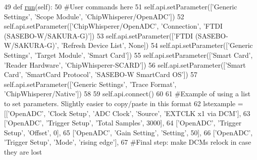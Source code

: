 \begin{DoxyCode}
49     \textcolor{keyword}{def }\hyperlink{classsoftware_1_1chipwhisperer_1_1capture_1_1scripts_1_1sasebow-cardos_1_1UserScript_ac357e0c8fbc56377a7dd0389173cd1be}{run}(self):
50         \textcolor{comment}{#User commands here}
51         self.api.setParameter([\textcolor{stringliteral}{'Generic Settings'}, \textcolor{stringliteral}{'Scope Module'}, \textcolor{stringliteral}{'ChipWhisperer/OpenADC'}])
52         self.api.setParameter([\textcolor{stringliteral}{'ChipWhisperer/OpenADC'}, \textcolor{stringliteral}{'Connection'}, \textcolor{stringliteral}{'FTDI (SASEBO-W/SAKURA-G)'}])
53         self.api.setParameter([\textcolor{stringliteral}{'FTDI (SASEBO-W/SAKURA-G)'}, \textcolor{stringliteral}{'Refresh Device List'}, \textcolor{keywordtype}{None}])
54         self.api.setParameter([\textcolor{stringliteral}{'Generic Settings'}, \textcolor{stringliteral}{'Target Module'}, \textcolor{stringliteral}{'Smart Card'}])
55         self.api.setParameter([\textcolor{stringliteral}{'Smart Card'}, \textcolor{stringliteral}{'Reader Hardware'}, \textcolor{stringliteral}{'ChipWhisperer-SCARD'}])
56         self.api.setParameter([\textcolor{stringliteral}{'Smart Card'}, \textcolor{stringliteral}{'SmartCard Protocol'}, \textcolor{stringliteral}{'SASEBO-W SmartCard OS'}])
57         self.api.setParameter([\textcolor{stringliteral}{'Generic Settings'}, \textcolor{stringliteral}{'Trace Format'}, \textcolor{stringliteral}{'ChipWhisperer/Native'}])
58 
59         self.api.connect()
60 
61         \textcolor{comment}{#Example of using a list to set parameters. Slightly easier to copy/paste in this format}
62         lstexample = [[\textcolor{stringliteral}{'OpenADC'}, \textcolor{stringliteral}{'Clock Setup'}, \textcolor{stringliteral}{'ADC Clock'}, \textcolor{stringliteral}{'Source'}, \textcolor{stringliteral}{'EXTCLK x1 via DCM'}],
63                       [\textcolor{stringliteral}{'OpenADC'}, \textcolor{stringliteral}{'Trigger Setup'}, \textcolor{stringliteral}{'Total Samples'}, 3000],
64                       [\textcolor{stringliteral}{'OpenADC'}, \textcolor{stringliteral}{'Trigger Setup'}, \textcolor{stringliteral}{'Offset'}, 0],
65                       [\textcolor{stringliteral}{'OpenADC'}, \textcolor{stringliteral}{'Gain Setting'}, \textcolor{stringliteral}{'Setting'}, 50],
66                       [\textcolor{stringliteral}{'OpenADC'}, \textcolor{stringliteral}{'Trigger Setup'}, \textcolor{stringliteral}{'Mode'}, \textcolor{stringliteral}{'rising edge'}],
67                       \textcolor{comment}{#Final step: make DCMs relock in case they are lost}

\end{DoxyCode}
